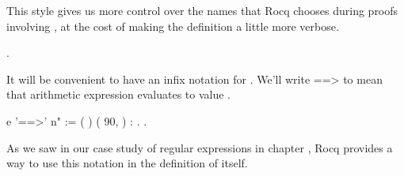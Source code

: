 \documentclass[12pt]{report}
\begin{document}
This style gives us more control over the names that Rocq chooses
    during proofs involving , at the cost of making the
    definition a little more verbose. 
\begin{coqdoccode}
\coqdocemptyline
\coqdocnoindent
{} .\coqdoceol
\coqdocemptyline
\end{coqdoccode}
It will be convenient to have an infix notation for
    .  We'll write  ==>  to mean that arithmetic expression
     evaluates to value . 
\begin{coqdoccode}
\coqdocemptyline
\coqdocnoindent
{} e '==>' n"\coqdoceol
\coqdocindent{4.50em}
:= (  )\coqdoceol
\coqdocindent{6.00em}
(  90,  )\coqdoceol
\coqdocindent{4.50em}
: .\coqdoceol
\coqdocemptyline
\coqdocnoindent
{} .\coqdoceol
\coqdocemptyline
\end{coqdoccode}
As we saw in our case study of regular expressions in
    chapter , Rocq provides a way to use this notation in
    the definition of  itself. 
\end{document}
